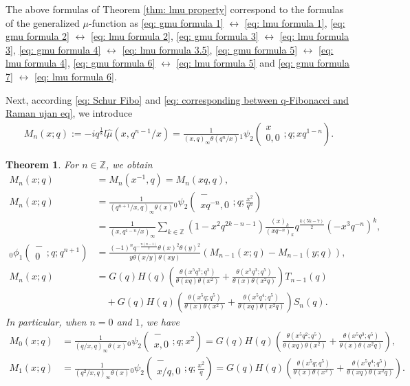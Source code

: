 \documentclass[a4paper]{article}
\newcommand{\Zz}{\mathbb{Z}}
\newcommand{\hyper}[4]{\left( \begin{matrix} #1 \\ #2 \end{matrix};#3;#4\right)}
\numberwithin{equation}{section}
\theoremstyle{plain}
\newtheorem{thm}{Theorem}
\begin{document}
The above formulas of Theorem \ref{thm: lmu property} correspond to the formulas of the generalized $\mu$-function as \eqref{eq: gmu formula 1} $\leftrightarrow$ \eqref{eq: lmu formula 1}, \eqref{eq: gmu formula 2} $\leftrightarrow$ \eqref{eq: lmu formula 2}, \eqref{eq: gmu formula 3} $\leftrightarrow$ \eqref{eq: lmu formula 3}, \eqref{eq: gmu formula 4} $\leftrightarrow$ \eqref{eq: lmu formula 3.5}, \eqref{eq: gmu formula 5} $\leftrightarrow$ \eqref{eq: lmu formula 4}, \eqref{eq: gmu formula 6} $\leftrightarrow$ \eqref{eq: lmu formula 5} and \eqref{eq: gmu formula 7} $\leftrightarrow$ \eqref{eq: lmu formula 6}.

Next, according \eqref{eq: Schur Fibo} and \eqref{eq: corresponding between q-Fibonacci and Raman ujan eq}, we introduce
\begin{align*}
M_n(x;q):=-iq^\frac{1}{8}l\widehat{\mu}(x,q^{n-1}/x)=\frac{1}{(x,q)_\infty\theta(q^n/x)}{}_1\psi_2\hyper{x}{0,0}{q}{x q^{1-n}}. 
\end{align*}
\begin{thm}
\label{thm: M_n and q-Fibonacci}
For $n\in\Zz$, we obtain
\begin{align}
\label{eq: M_n formula 1}
M_n(x;q)
  &=
  M_n(x^{-1},q)=M_n(x q,q), \\
\label{eq: M_n formula 2}  
M_n(x;q)
  &=
  \frac{1}{(q^{n+1}/x,q)_\infty\theta(x)}
  {}_0\psi_2\hyper{-}{xq^{-n},0}{q}{\frac{x^2}{q^n}} \\
\label{eq: M_n formula 3}
  &=
  \frac{1}{(x,q^{1-n}/x)_\infty}\sum_{k\in\Zz}\left(1-x^2q^{2k-n-1}\right)\frac{(x)_k}{(xq^{-n})_k}q^{\frac{k(5k-7)}{2}}(-x^3q^{-n})^k, \\
\label{eq: M_n formula 4}
  {}_0\phi_1\hyper{-}{0}{q}{q^{n+1}}&=\frac{(-1)^nq^{-\frac{n(n-1)}{2}}\theta(x)^2\theta(y)^2}{y\theta(x/y)\theta(xy)}(M_{n-1}(x;q)-M_{n-1}(y;q)), \\
  M_n(x;q)&=G(q)H(q)\left(\frac{\theta(x^5q^2;q^5)}{\theta(x q)\theta(x^2)}+\frac{\theta(x^5q^3;q^5)}{\theta(x)\theta(x^2q)}\right)T_{n-1}(q)
  \nonumber\\
\label{eq: M_n and S_n and T_n}
  &\quad+G(q)H(q)\left(\frac{\theta(x^5q;q^5)}{\theta(x)\theta(x^2)}+\frac{\theta(x^5q^4;q^5)}{\theta(x q)\theta(x^2q)}\right)S_n(q). 
\end{align} 
In particular, when $n=0$ and $1$, we have 
\begin{align}
\label{eq: M_0}
  M_{0}(x;q)
  &=
  \frac{1}{(q/x,q)_\infty\theta(x)}{}_0\psi_2\hyper{-}{x,0}{q}{x^2}
  =
  G(q)H(q)\left(\frac{\theta(x^5q^2;q^5)}{\theta(x q)\theta(x^2)}+\frac{\theta(x^5q^3;q^5)}{\theta(x)\theta(x^2q)}\right), \\
\label{eq: M_1}
M_1(x;q)
  &=
  \frac{1}{(q^2/x,q)_\infty\theta(x)}{}_0\psi_2\hyper{-}{x/q,0}{q}{\frac{x^2}{q}}
  =
  G(q)H(q)\left(\frac{\theta(x^5q;q^5)}{\theta(x)\theta(x^2)}+\frac{\theta(x^5q^4;q^5)}{\theta(x q)\theta(x^2q)}\right). 
\end{align}
\end{thm}
\end{document}
